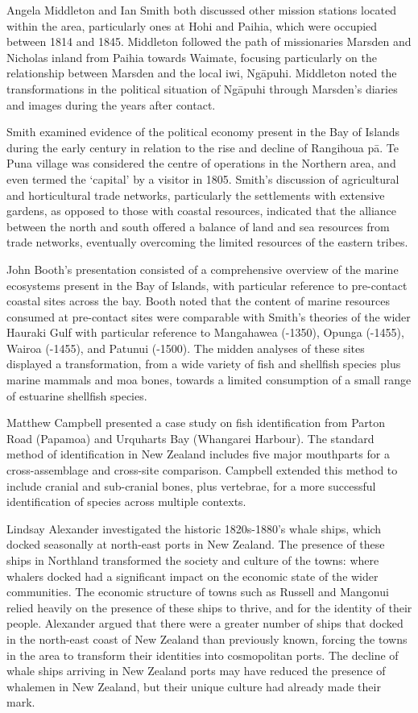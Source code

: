 Angela Middleton and Ian Smith both discussed other mission stations located within the area, particularly ones at Hohi and Paihia, which were occupied between 1814 and 1845. Middleton followed the path of missionaries Marsden and Nicholas inland from Paihia towards Waimate, focusing particularly on the relationship between Marsden and the local iwi, Ngāpuhi. Middleton noted the transformations in the political situation of Ngāpuhi through Marsden's diaries and images during the years after contact. 

Smith examined evidence of the political economy present in the Bay of Islands during the early  century in relation to the rise and decline of Rangihoua pā. Te Puna village was considered the centre of operations in the Northern area, and even termed the ‘capital’ by a visitor in 1805. Smith’s discussion of agricultural and horticultural trade networks, particularly the settlements with extensive gardens, as opposed to those with coastal resources, indicated that the alliance between the north and south offered a balance of land and sea resources from trade networks, eventually overcoming the limited resources of the eastern tribes.

John Booth’s presentation consisted of a comprehensive overview of the marine ecosystems present in the Bay of Islands, with particular reference to pre-contact coastal sites across the bay. Booth noted that the content of marine resources consumed at pre-contact sites were comparable with Smith’s theories of the wider Hauraki Gulf with particular reference to Mangahawea (-1350), Opunga (-1455), Wairoa (-1455), and Patunui (-1500). The midden analyses of these sites displayed a transformation, from a wide variety of fish and shellfish species plus marine mammals and moa bones, towards a limited consumption of a small range of estuarine shellfish species.

Matthew Campbell presented a case study on fish identification from Parton Road (Papamoa) and Urquharts Bay (Whangarei Harbour). The standard method of identification in New Zealand includes five major mouthparts for a cross-assemblage and cross-site comparison. Campbell extended this method to include cranial and sub-cranial bones, plus vertebrae, for a more successful identification of species across multiple contexts.    
  
Lindsay Alexander investigated the historic 1820s-1880's whale ships, which docked seasonally at north-east ports in New Zealand. The presence of these ships in Northland transformed the society and culture of the towns: where whalers docked had a significant impact on the economic state of the wider communities. The economic structure of towns such as Russell and Mangonui relied heavily on the presence of these ships to thrive, and for the identity of their people. Alexander argued that there were a greater number of ships that docked in the north-east coast of New Zealand than previously known, forcing the towns in the area to transform their identities into cosmopolitan ports. The decline of whale ships arriving in New Zealand ports may have reduced the presence of whalemen in New Zealand, but their unique culture had already made their mark. 

